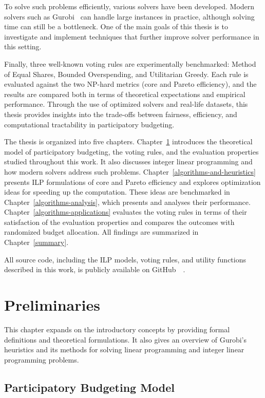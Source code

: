 \documentclass[magisterska,en]{pracamgr}
\begin{document}
To solve such problems efficiently, various solvers have been developed. Modern solvers such as Gurobi~\cite{6} can handle large instances in practice, although solving time can still be a bottleneck. One of the main goals of this thesis is to investigate and implement techniques that further improve solver performance in this setting.

Finally, three well-known voting rules are experimentally benchmarked: Method of Equal Shares, Bounded Overspending, and Utilitarian Greedy. Each rule is evaluated against the two NP-hard metrics (core and Pareto efficiency), and the results are compared both in terms of theoretical expectations and empirical performance. Through the use of optimized solvers and real-life datasets, this thesis provides insights into the trade-offs between fairness, efficiency, and computational tractability in participatory budgeting.

The thesis is organized into five chapters. Chapter~\ref{preliminaries} introduces the theoretical model of participatory budgeting, the voting rules, and the evaluation properties studied throughout this work. It also discusses integer linear programming and how modern solvers address such problems. Chapter~\ref{algorithms-and-heuristics} presents ILP formulations of core and Pareto efficiency and explores optimization ideas for speeding up the computation. These ideas are benchmarked in Chapter~\ref{algorithms-analysis}, which presents and analyses their performance. Chapter~\ref{algorithms-applications} evaluates the voting rules in terms of their satisfaction of the evaluation properties and compares the outcomes with randomized budget allocation. All findings are summarized in Chapter~\ref{summary}.

All source code, including the ILP models, voting rules, and utility functions described in this work, is publicly available on GitHub~\cite{7}~\cite{8}.

\chapter{Preliminaries}
\label{preliminaries}

This chapter expands on the introductory concepts by providing formal definitions and theoretical formulations. It also gives an overview of Gurobi’s heuristics and its methods for solving linear programming and integer linear programming problems.

\section{Participatory Budgeting Model}
\end{document}
